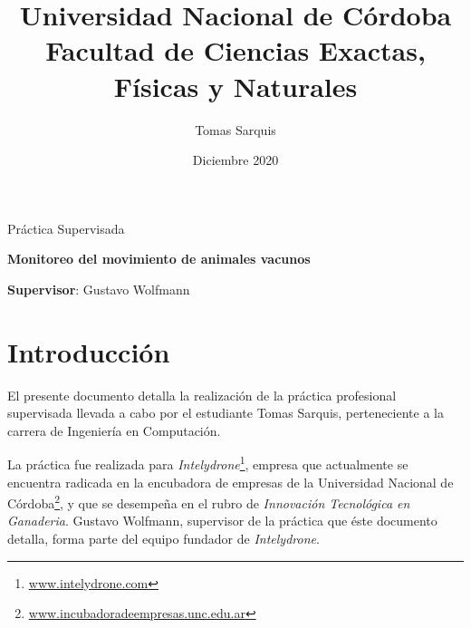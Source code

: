 \documentclass{article}
\title{Universidad Nacional de Córdoba\\Facultad de Ciencias Exactas, Físicas y Naturales}
\author{Tomas Sarquis}
\date{Diciembre 2020}
\newcommand{ \fnintelydrone }{\footnote{\url{www.intelydrone.com}}}
\newcommand{ \fnincubadora }{\footnote{\url{www.incubadoradeempresas.unc.edu.ar}}}
\begin{document}

    \begin{titlingpage}
        \maketitle
        \null \null \null \null 
        
        \begin{center}
            {\huge Práctica Supervisada}
        \end{center}
        
        
        \null \null \null \null \null \null 
        
        \begin{center}
            {\large \textbf{Monitoreo del movimiento de animales vacunos}}
        \end{center}
        
        \begin{center}
            {\large \textbf{Supervisor}: Gustavo Wolfmann }
        \end{center}

    \end{titlingpage}


    \tableofcontents 


    \newpage
    \section{Introducción}

    El presente documento detalla la realización de la práctica profesional
    supervisada llevada a cabo por el estudiante Tomas Sarquis, perteneciente 
    a la carrera de Ingeniería en Computación. \par

    La práctica fue realizada para \emph{Intelydrone}\fnintelydrone, empresa 
    que actualmente se encuentra radicada en la encubadora de empresas de la 
    Universidad Nacional de Córdoba\fnincubadora, y que se desempeña en el 
    rubro de \emph{Innovación Tecnológica en Ganaderia}. Gustavo Wolfmann,
    supervisor de la práctica que éste documento detalla, forma parte del 
    equipo fundador de \emph{Intelydrone}. \par
\end{document}
